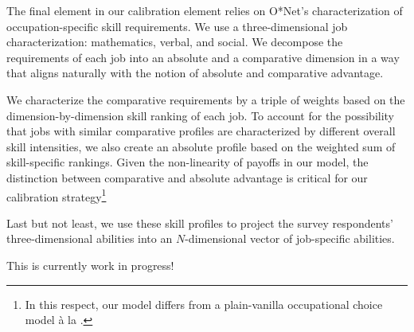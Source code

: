 \documentclass[onehalfspacing,11pt]{article}
\begin{document}
The final element in our calibration element relies on O*Net's characterization of occupation-specific skill requirements. We use a three-dimensional job characterization: mathematics, verbal, and social. We decompose the requirements of each job into an absolute and a comparative dimension in a way that aligns naturally with the notion of absolute and comparative advantage.

We characterize the comparative requirements by a triple of weights based on the dimension-by-dimension skill ranking of each job. To account for the possibility that jobs with similar comparative profiles are characterized by different overall skill intensities, we also create an absolute profile based on the weighted sum of skill-specific rankings. Given the non-linearity of payoffs in our model, the distinction between comparative and absolute advantage is critical for our calibration strategy\footnote{In this respect, our model differs from a plain-vanilla occupational choice model \`a la \cite{Roy:1951}.}

Last but not least, we use these skill profiles to project the survey respondents' three-dimensional abilities into an $N$-dimensional vector of job-specific abilities.

{\sc This is currently work in progress!}


\end{document}
